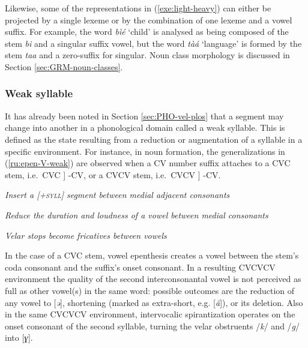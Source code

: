 Likewise,  some of the representations in (\ref{exe:light-heavy}) can
either be
projected by a single lexeme or by the combination of  one lexeme and a vowel
suffix.  For example,  the word {\it bìé} `child' is analysed as being 
composed of the
stem {\it bi}    and a singular suffix vowel, but the word {\it tàá}  
`language' is  formed by the stem {\it taa}  and a  zero-suffix for
singular.   Noun class morphology is discussed in Section 
\ref{sec:GRM-noun-classes}. 

 


\subsubsection{Weak syllable}
\label{sec:PHO-weak-syll}

It has already been noted in Section \ref{sec:PHO-vel-plos} that a segment may 
change into another in a phonological domain called a weak syllable.  This is  
defined  as the state resulting from a reduction or augmentation of a syllable 
in a specific environment.  For instance, in noun formation, the 
generalizations in 
(\ref{ru:epen-V-weak}) are observed when a CV number suffix attaches to a CVC 
stem, i.e.\ CVC ] -CV, or a CVCV stem, i.e.\ CVCV ] -CV. 



\ea\label{ru:epen-V-weak}
\par\nobreak\smallskip
\textit{Insert a \textsc{[+syll]} segment between medial adjacent consonants}

\par\nobreak\smallskip
\textit{Reduce the duration and loudness of a vowel between medial consonants}


\par\nobreak\smallskip
\textit{Velar stops become fricatives between vowels}

\z
\z


In the case of a CVC 
stem, vowel epenthesis creates a vowel between the stem's coda consonant and the 
suffix's onset consonant.   In a resulting CVCVCV environment the quality of the 
second interconsonantal vowel  is not perceived as full as other vowel(s) in the 
same word: possible outcomes are the reduction of any vowel to [\textit{ə}],  
shortening  (marked as extra-short, e.g.  [\textit{ă}]),  or its  deletion. 
Also in the same CVCVCV environment, intervocalic spirantization operates on the 
onset consonant of the second syllable,  turning the velar obstruents /{\it k}/ 
and /{\it g}/ into [{\it ɣ}]. 





